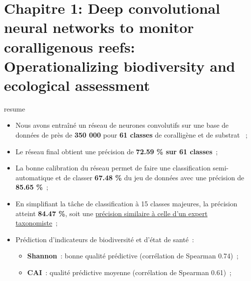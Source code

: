 \chapter[Deep convolutional neural networks to monitor coralligenous reefs: Operationalizing biodiversity and ecological assessment]{Chapitre 1: Deep convolutional neural networks to monitor coralligenous reefs: Operationalizing biodiversity and ecological assessment} \label{chapitre1-deep}

\pagestyle{main}

\begin{center}
\end{center}

\begin{center}
\begin{colbox}{resume}
  \vspace{-2pt}
{\color{textresume}\small
\begin{itemize}[leftmargin=0in]\itemsep3pt
\item Nous avons entraîné un réseau de neurones convolutifs sur une base de données de près de \textbf{350 000} pour \textbf{61 classes} de coralligène et de substrat ~;
\item Le réseau final obtient une précision de \textbf{72.59 \% sur 61 classes}~;
\item La bonne calibration du réseau permet de faire une classification semi-automatique et de classer \textbf{67.48 \%} du jeu de données avec une précision de \textbf{85.65 \%}~;
\item En simplifiant la tâche de classification à 15 classes majeures, la précision atteint \textbf{84.47 \%}, soit une \underline{précision similaire à celle d'un expert taxonomiste}~;
\item Prédiction d'indicateurs de biodiversité et d'état de santé~:
\begin{itemize}
  \item \textbf{Shannon}~: bonne qualité prédictive (corrélation de Spearman 0.74)~;
  \item \textbf{CAI}~: qualité prédictive moyenne (corrélation de Spearman 0.61)~;
\end{itemize}
\end{itemize}
}
\vspace{-2pt}
\end{colbox}
\end{center}

